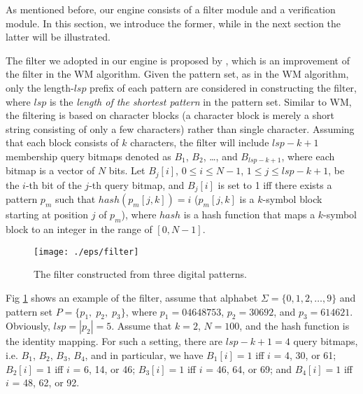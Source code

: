 As mentioned before, our engine consists of a filter module and a
verification module. In this section, we introduce the former, while
in the next section the latter will be illustrated.

The filter we adopted in our engine is proposed by \cite{Lee2013},
which is an improvement of the filter in the WM algorithm. Given the
pattern set, as in the WM algorithm, only the length-$lsp$ prefix of
each pattern are considered in constructing the filter, where $lsp$ is
the \emph{length of the shortest pattern} in the pattern set. Similar
to WM, the filtering is based on character blocks (a character block
is merely a short string consisting of only a few characters) rather
than single character. Assuming that each block consists of $k$
characters, the filter will include $lsp-k+1$ membership query bitmaps
denoted as $B_1$, $B_2$, \dots, and $B_{lsp-k+1}$, where each bitmap
is a vector of $N$ bits. Let $B_j[i]$, $0 \leq i \leq N - 1$,
$1 \leq j \leq lsp-k+1$, be the $i$-th bit of the $j$-th query bitmap,
and $B_j[i]$ is set to 1 iff there exists a pattern $p_m$ such that
$hash(p_m[j,k]) = i$ ($p_m[j,k]$ is a $k$-symbol block starting at
position $j$ of $p_m$), where $hash$ is a hash function that maps a
$k$-symbol block to an integer in the range of $[0, N-1]$.

\begin{figure}[htbp]
  \centering
  \texttt{[image: ./eps/filter]}
  \caption{The filter constructed from three digital patterns.}
  \label{fig:filter}
\end{figure}

Fig \ref{fig:filter} shows an example of the filter, assume that
alphabet $\Sigma = \{0, 1, 2, \dots, 9\}$ and pattern set
$P = \{p_1,\; p_2,\; p_3\}$, where $p_1 = 04648753$, $p_2 = 30692$,
and $p_3 = 614621$.  Obviously, $lsp = |p_2|= 5$. Assume that $k = 2$,
$N = 100$, and the hash function is the identity mapping. For such a
setting, there are $lsp - k + 1 = 4$ query bitmaps, i.e. $B_1$, $B_2$,
$B_3$, $B_4$, and in particular, we have $B_1[i] = 1$ iff $i$ = 4, 30,
or 61; $B_2[i] = 1$ iff $i$ = 6, 14, or 46; $B_3[i] = 1$ iff $i$ = 46,
64, or 69; and $B_4[i] = 1$ iff $i$ = 48, 62, or 92.

